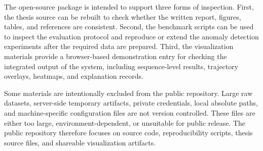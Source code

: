 The open-source package is intended to support three forms of inspection. First, the thesis source can be rebuilt to check whether the written report, figures, tables, and references are consistent. Second, the benchmark scripts can be used to inspect the evaluation protocol and reproduce or extend the anomaly detection experiments after the required data are prepared. Third, the visualization materials provide a browser-based demonstration entry for checking the integrated output of the system, including sequence-level results, trajectory overlays, heatmaps, and explanation records.

Some materials are intentionally excluded from the public repository. Large raw datasets, server-side temporary artifacts, private credentials, local absolute paths, and machine-specific configuration files are not version controlled. These files are either too large, environment-dependent, or unsuitable for public release. The public repository therefore focuses on source code, reproducibility scripts, thesis source files, and shareable visualization artifacts.
